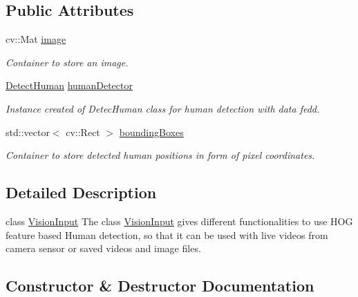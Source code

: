 \subsection*{Public Attributes}
\begin{DoxyCompactItemize}
\item 
cv\+::\+Mat \hyperlink{classVisionInput_a70fb6d723dd13355981e263f11b798ab}{image}\hypertarget{classVisionInput_a70fb6d723dd13355981e263f11b798ab}{}\label{classVisionInput_a70fb6d723dd13355981e263f11b798ab}

\begin{DoxyCompactList}\small\item\em Container to store an image. \end{DoxyCompactList}\item 
\hyperlink{classDetectHuman}{Detect\+Human} \hyperlink{classVisionInput_a9888dff84fef69e454dbd2a38735d2da}{human\+Detector}\hypertarget{classVisionInput_a9888dff84fef69e454dbd2a38735d2da}{}\label{classVisionInput_a9888dff84fef69e454dbd2a38735d2da}

\begin{DoxyCompactList}\small\item\em Instance created of Detec\+Human class for human detection with data fedd. \end{DoxyCompactList}\item 
std\+::vector$<$ cv\+::\+Rect $>$ \hyperlink{classVisionInput_af46eecf1faba0b375ce0acbbc4605043}{bounding\+Boxes}\hypertarget{classVisionInput_af46eecf1faba0b375ce0acbbc4605043}{}\label{classVisionInput_af46eecf1faba0b375ce0acbbc4605043}

\begin{DoxyCompactList}\small\item\em Container to store detected human positions in form of pixel coordinates. \end{DoxyCompactList}\end{DoxyCompactItemize}


\subsection{Detailed Description}
class \hyperlink{classVisionInput}{Vision\+Input} The class \hyperlink{classVisionInput}{Vision\+Input} gives different functionalities to use H\+OG feature based Human detection, so that it can be used with live videos from camera sensor or saved videos and image files. 

\subsection{Constructor \& Destructor Documentation}
